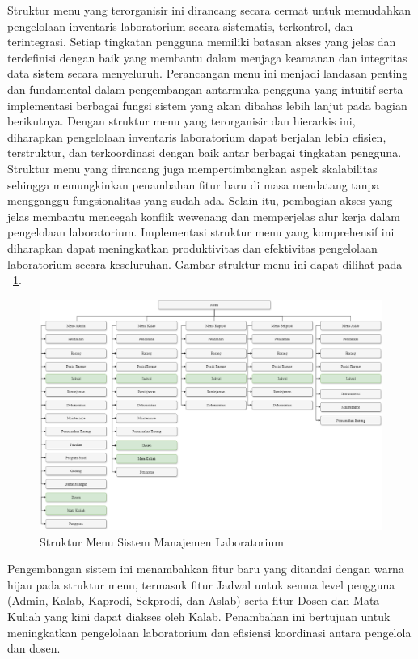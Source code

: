 Struktur menu yang terorganisir ini dirancang secara cermat untuk memudahkan pengelolaan inventaris laboratorium secara sistematis, terkontrol, dan terintegrasi. Setiap tingkatan pengguna memiliki batasan akses yang jelas dan terdefinisi dengan baik yang membantu dalam menjaga keamanan dan integritas data sistem secara menyeluruh. Perancangan menu ini menjadi landasan penting dan fundamental dalam pengembangan antarmuka pengguna yang intuitif serta implementasi berbagai fungsi sistem yang akan dibahas lebih lanjut pada bagian berikutnya. Dengan struktur menu yang terorganisir dan hierarkis ini, diharapkan pengelolaan inventaris laboratorium dapat berjalan lebih efisien, terstruktur, dan terkoordinasi dengan baik antar berbagai tingkatan pengguna. Struktur menu yang dirancang juga mempertimbangkan aspek skalabilitas sehingga memungkinkan penambahan fitur baru di masa mendatang tanpa mengganggu fungsionalitas yang sudah ada. Selain itu, pembagian akses yang jelas membantu mencegah konflik wewenang dan memperjelas alur kerja dalam pengelolaan laboratorium. Implementasi struktur menu yang komprehensif ini diharapkan dapat meningkatkan produktivitas dan efektivitas pengelolaan laboratorium secara keseluruhan. Gambar struktur menu ini dapat dilihat pada \pic~\ref{StrukturMenuILMIS}.

\begin{figure}[h]
	\centering
	\includegraphics[width=1\textwidth]{konten/gambar/menu.png}
	\caption{Struktur Menu Sistem Manajemen Laboratorium}
	\label{StrukturMenuILMIS}
\end{figure}

Pengembangan sistem ini menambahkan fitur baru yang ditandai dengan warna hijau pada struktur menu, termasuk fitur Jadwal untuk semua level pengguna (Admin, Kalab, Kaprodi, Sekprodi, dan Aslab) serta fitur Dosen dan Mata Kuliah yang kini dapat diakses oleh Kalab. Penambahan ini bertujuan untuk meningkatkan pengelolaan laboratorium dan efisiensi koordinasi antara pengelola dan dosen.

